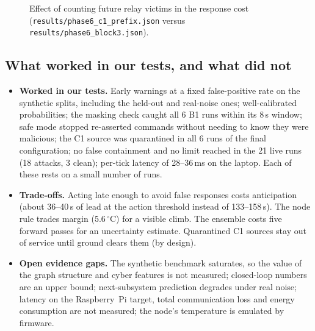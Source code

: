 \documentclass[10pt,a4paper]{article}
\newcommand{\file}[1]{\texttt{#1}}
\newcommand{\degC}{$^{\circ}$C}
\begin{document}
\begin{figure}[ht]
\centering
{}
\caption{Effect of counting future relay victims in the response cost (\file{results/phase6\_c1\_prefix.json}
versus \file{results/phase6\_block3.json}).}
\label{fig:c1}
\end{figure}

\subsection{What worked in our tests, and what did not}
\begin{itemize}
\item \textbf{Worked in our tests.} Early warnings at a fixed false-positive rate on the synthetic
splits, including the held-out and real-noise ones; well-calibrated probabilities; the masking check
caught all 6 B1 runs within its 8\,s window; safe mode stopped re-asserted commands without needing
to know they were malicious; the C1 source was quarantined in all 6 runs of the final configuration;
no false containment and no limit reached in the 21 live runs (18 attacks, 3 clean); per-tick latency
of 28--36\,ms on the laptop. Each of these rests on a small number of runs.
\item \textbf{Trade-offs.} Acting late enough to avoid false responses costs anticipation (about 36--40\,s
of lead at the action threshold instead of 133--158\,s). The node rule trades margin (5.6\,\degC) for a
visible climb. The ensemble costs five forward passes for an uncertainty estimate. Quarantined C1
sources stay out of service until ground clears them (by design).
\item \textbf{Open evidence gaps.} The synthetic benchmark saturates, so the value of the graph
structure and cyber features is not measured; closed-loop numbers are an upper bound; next-subsystem
prediction degrades under real noise; latency on the Raspberry~Pi target, total communication loss and
energy consumption are not measured; the node's temperature is emulated by firmware.
\end{itemize}



\end{document}
